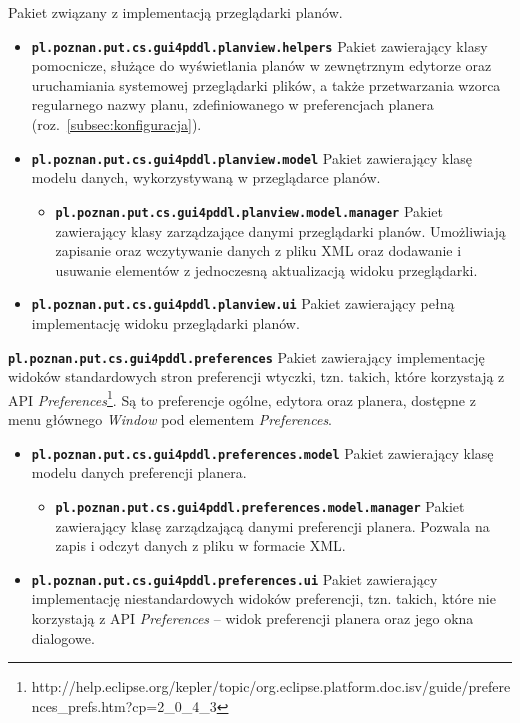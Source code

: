 \begin{description}
\item [\texttt{pl.poznan.put.cs.gui4pddl.planview}] Pakiet związany z implementacją przeglądarki planów.
\begin{itemize}
\item \texttt{\textbf{pl.poznan.put.cs.gui4pddl.planview.helpers}} Pakiet zawierający klasy pomocnicze, służące do wyświetlania planów w zewnętrznym edytorze oraz uruchamiania systemowej przeglądarki plików, a także przetwarzania wzorca regularnego nazwy planu, zdefiniowanego w preferencjach planera (roz.~\ref{subsec:konfiguracja}).
\item \texttt{\textbf{pl.poznan.put.cs.gui4pddl.planview.model}} Pakiet zawierający klasę modelu danych, wykorzystywaną w przeglądarce planów.
\begin{itemize}
\item \texttt{\textbf{pl.poznan.put.cs.gui4pddl.planview.model.manager}} Pakiet zawierający klasy zarządzające danymi przeglądarki planów. Umożliwiają zapisanie oraz wczytywanie danych z pliku XML oraz dodawanie i usuwanie elementów z jednoczesną aktualizacją widoku przeglądarki.
\end{itemize}
\item \texttt{\textbf{pl.poznan.put.cs.gui4pddl.planview.ui}} Pakiet zawierający pełną implementację widoku przeglądarki planów.
\end{itemize}
\item \texttt{\textbf{pl.poznan.put.cs.gui4pddl.preferences}} Pakiet zawierający implementację widoków standardowych stron preferencji wtyczki, tzn. takich, które korzystają z API \emph{Preferences}\footnote{http://help.eclipse.org/kepler/topic/org.eclipse.platform.doc.isv/guide/preferences\_prefs.htm?cp=2\_0\_4\_3}. Są to preferencje ogólne, edytora oraz planera, dostępne z menu głównego \textit{Window} pod elementem \textit{Preferences}.
\begin{itemize}
\item \texttt{\textbf{pl.poznan.put.cs.gui4pddl.preferences.model}} Pakiet zawierający klasę modelu danych preferencji planera.
\begin{itemize}
\item \texttt{\textbf{pl.poznan.put.cs.gui4pddl.preferences.model.manager}} Pakiet zawierający klasę zarządzającą danymi preferencji planera. Pozwala na zapis i odczyt danych z pliku w formacie XML.
\end{itemize}
\item \texttt{\textbf{pl.poznan.put.cs.gui4pddl.preferences.ui}} Pakiet zawierający implementację niestandardowych widoków preferencji, tzn. takich, które nie korzystają z API \emph{Preferences} -- widok preferencji planera oraz jego okna dialogowe.

\end{itemize}
\end{description}
